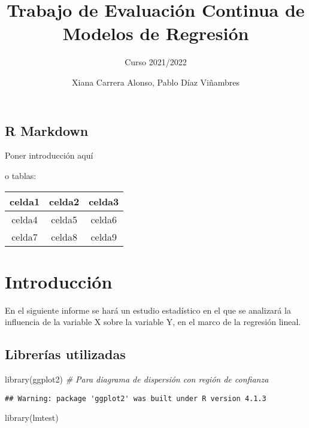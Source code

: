 \documentclass[
]{article}
\title{Trabajo de Evaluación Continua de Modelos de Regresión}
\subtitle{Curso 2021/2022}
\author{Xiana Carrera Alonso, Pablo Díaz Viñambres}
\date{}
\newenvironment{Shaded}{\begin{snugshade}}{\end{snugshade}}
\newcommand{\CommentTok}[1]{\textcolor[rgb]{0.56,0.35,0.01}{\textit{#1}}}
\newcommand{\FunctionTok}[1]{\textcolor[rgb]{0.00,0.00,0.00}{#1}}
\newcommand{\NormalTok}[1]{#1}
\begin{document}
\maketitle

\hypertarget{r-markdown}{%
\subsection{R Markdown}\label{r-markdown}}

Poner introducción aquí

o tablas:

\begin{center}
\begin{tabular}{ |c c c| }
 \hline
 celda1 & celda2 & celda3 \\
 \hline
 celda4 & celda5 & celda6 \\  
 celda7 & celda8 & celda9 \\   
  \hline
\end{tabular}
\end{center}

\hypertarget{introducciuxf3n}{%
\section{Introducción}\label{introducciuxf3n}}

En el siguiente informe se hará un estudio estadístico en el que se
analizará la influencia de la variable X sobre la variable Y, en el
marco de la regresión lineal.

\hypertarget{libreruxedas-utilizadas}{%
\subsection{Librerías utilizadas}\label{libreruxedas-utilizadas}}

\begin{Shaded}
\begin{Highlighting}[]
\FunctionTok{library}\NormalTok{(ggplot2)      }\CommentTok{\# Para diagrama de dispersión con región de confianza}
\end{Highlighting}
\end{Shaded}

\begin{verbatim}
## Warning: package 'ggplot2' was built under R version 4.1.3
\end{verbatim}

\begin{Shaded}
\begin{Highlighting}[]
\FunctionTok{library}\NormalTok{(lmtest)}
\end{Highlighting}
\end{Shaded}
\end{document}
